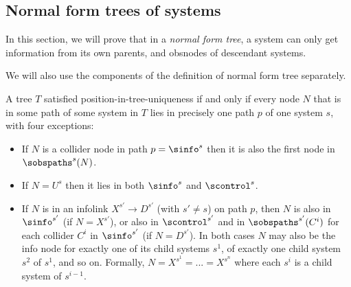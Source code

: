 \subsection{Normal form trees of systems} \label{sec:normal-form-trees}

In this section, we will prove that 
in a \emph{normal form tree},
a system can only get information from 
its own parents, and obsnodes of descendant systems.


We will also use the components of the definition of normal form tree separately. 


\begin{lemma}\label{le:21-may-9-position-in-tree-uniqueness-properties}
A tree $T$ satisfied position-in-tree-uniqueness if and only if every node $N$ that is in some path of some system in $T$ lies in precisely one path $p$ of one system $s$, with four exceptions:
    \begin{itemize}
        \item If $N$ is a collider node in 
        path $p=\sinfo^s$ 
        then it is also the first node in 
        $\sobspaths^s(N)$.
        
        \item If $N=U^s$ then it lies in both $\sinfo^s$ and $\scontrol^s$.
        
        \item If $N$ is in an infolink $X^{s'} \to D^{s'}$ (with $s' \neq s$) on path $p$, 
        then $N$ is also in $\sinfo^{s'}$ (if $N=X^{s'}$), or also in $\scontrol^{s'}$ and in $\sobspaths^{s'}(C^i)$ for each collider $C^i$ in $\sinfo^{s'}$ (if $N=D^{s'}$). In both cases 
        $N$ may also be the info node for exactly one of its child systems $s^1$, of exactly one child system $s^2$ of $s^1$, and so on.
        Formally, $N=X^{s^1}=...=X^{s^n}$ where each $s^{i}$ is a child system of $s^{i-1}$.
    \end{itemize}
\end{lemma}
